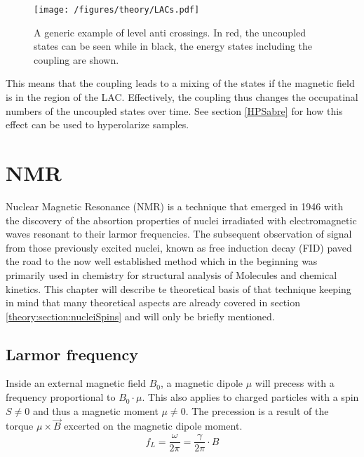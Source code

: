             \begin{figure}
                \centering
                \texttt{[image: /figures/theory/LACs.pdf]}
                \caption[Leval anti crossings]{A generic example of level anti crossings. In red, the uncoupled states can be seen while in black, the energy states including the coupling are shown.}
                \label{figure:theory:LAC}
            \end{figure}
            This means that the coupling leads to a mixing of the states if the magnetic field is in the region of the LAC. Effectively, the coupling thus changes the occupatinal numbers of the uncoupled states over time. See section \ref{HPSabre} for how this effect can be used to hyperolarize samples.
    \section{NMR}
        Nuclear Magnetic Resonance (NMR) is a technique that emerged in 1946 with the discovery
        of the absortion properties of nuclei irradiated with electromagnetic waves resonant to their
        larmor frequencies.\cite{ResonanceAbsorption} The subsequent observation of signal from those
        previously excited nuclei, known as free induction decay (FID) paved the road to the now well
        established method which in the beginning was primarily used in chemistry for structural
        analysis of Molecules and chemical kinetics. This chapter will describe te theoretical basis of that technique keeping in mind that many theoretical aspects are already covered in section \ref{theory:section:nucleiSpins} and will only be briefly mentioned.
        \subsection{Larmor frequency}
        \label{section:theory:larmorFrequency}
            Inside an external magnetic field $B_0$, a magnetic dipole $\mu$ will precess with a frequency
            proportional to $B_0\cdot \mu$. This also applies to charged particles with a spin $S\neq0$ and thus
            a magnetic moment $\mu\neq0$. The precession is a result of the torque $\mu\times\vec B$
            excerted on the magnetic dipole moment.
            \begin{equation}
                f_L=\frac{\omega}{2\pi} = \frac{\gamma}{2\pi}\cdot B
            \end{equation}
